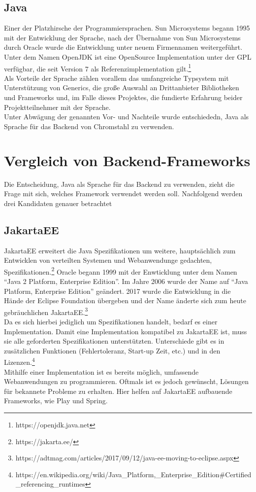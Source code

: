 \subsection{Java}
Einer der Platzhirsche der Programmiersprachen. Sun Microsystems begann 1995 mit
der Entwicklung der Sprache, nach der Übernahme von Sun Microsystems durch Oracle wurde die
Entwicklung unter neuem Firmennamen weitergeführt. Unter dem Namen OpenJDK ist
eine OpenSource Implementation unter der \ac{GPL} verfügbar, die seit Version 7 als
Referenzimplementation gilt.\footnote{https://openjdk.java.net}\\
Als Vorteile der Sprache zählen vorallem das umfangreiche Typsystem mit
Unterstützung von Generics, die große Auswahl an Drittanbieter Bibliotheken und Frameworks und,
im Falle dieses Projektes, die fundierte Erfahrung beider Projektteilnehmer mit
der Sprache.\\
Unter Abwägung der genannten Vor- und Nachteile wurde entschiededn, Java als
Sprache für das Backend von Chromstahl zu verwenden.
\section{Vergleich von Backend-Frameworks}
Die Entscheidung, Java als Sprache für das Backend zu verwenden, zieht die Frage
mit sich, welches Framework verwendet werden soll. Nachfolgend werden drei
Kandidaten genauer betrachtet
\subsection{\acl{JakartaEE}}
\ac{JakartaEE} erweitert die Java Spezifikationen um weitere, hauptsächlich zum
Entwicklen von verteilten Systemen und Webanwendunge gedachten, Spezifikationen.\footnote{https://jakarta.ee/}
Oracle begann 1999 mit der
Enwticklung unter dem Namen ``Java 2 Platform, Enterprise Edition''. Im Jahre
2006 wurde der Name auf ``Java Platform, Enterprise Edition'' geändert. 2017
wurde die Entwicklung in die Hände der Eclipse Foundation übergeben und der Name
änderte sich zum heute gebräuchlichen
\acs{JakartaEE}.\footnote{https://adtmag.com/articles/2017/09/12/java-ee-moving-to-eclipse.aspx}\\
Da es sich hierbei jediglich um Spezifikationen handelt, bedarf es einer
Implementation. Damit eine Implementation kompatibel zu \ac{JakartaEE} ist, muss
sie alle geforderten Spezifikationen unterstützten. Unterschiede gibt es in
zusätzlichen Funktionen (Fehlertoleranz, Start-up Zeit, etc.) und in den
Lizenzen.\footnote{https://en.wikipedia.org/wiki/Java\_Platform,\_Enterprise\_Edition\#Certified\_referencing\_runtimes}\\
Mithilfe einer Implementation ist es bereits möglich, umfassende Webanwendungen
zu programmieren. Oftmals ist es jedoch gewünscht, Lösungen für bekannete
Probleme zu erhalten. Hier helfen auf \ac{JakartaEE} aufbauende Frameworks, wie
Play und Spring.
